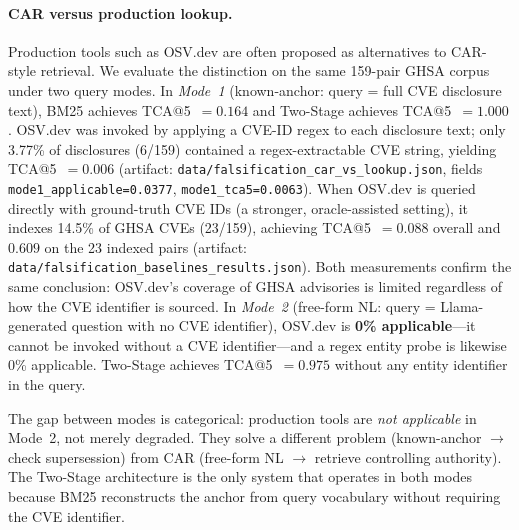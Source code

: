 \documentclass[11pt]{article}
\begin{document}
\paragraph{CAR versus production lookup.}
Production tools such as OSV.dev are often proposed as alternatives to CAR-style retrieval. We evaluate the distinction on the same 159-pair GHSA corpus under two query modes. In \emph{Mode~1} (known-anchor: query = full CVE disclosure text), BM25 achieves TCA@5~$= 0.164$ and Two-Stage achieves TCA@5~$= 1.000$. OSV.dev was invoked by applying a CVE-ID regex to each disclosure text; only 3.77\% of disclosures (6/159) contained a regex-extractable CVE string, yielding TCA@5~$= 0.006$ (artifact: \texttt{data/falsification\_car\_vs\_lookup.json}, fields \texttt{mode1\_applicable=0.0377}, \texttt{mode1\_tca5=0.0063}). When OSV.dev is queried directly with ground-truth CVE IDs (a stronger, oracle-assisted setting), it indexes 14.5\% of GHSA CVEs (23/159), achieving TCA@5~$= 0.088$ overall and $0.609$ on the 23 indexed pairs (artifact: \texttt{data/falsification\_baselines\_results.json}). Both measurements confirm the same conclusion: OSV.dev's coverage of GHSA advisories is limited regardless of how the CVE identifier is sourced. In \emph{Mode~2} (free-form NL: query = Llama-generated question with no CVE identifier), OSV.dev is \textbf{0\% applicable}---it cannot be invoked without a CVE identifier---and a regex entity probe is likewise 0\% applicable. Two-Stage achieves TCA@5~$= 0.975$ without any entity identifier in the query.

The gap between modes is categorical: production tools are \emph{not applicable} in Mode~2, not merely degraded. They solve a different problem (known-anchor $\to$ check supersession) from CAR (free-form NL $\to$ retrieve controlling authority). The Two-Stage architecture is the only system that operates in both modes because BM25 reconstructs the anchor from query vocabulary without requiring the CVE identifier.
\end{document}
